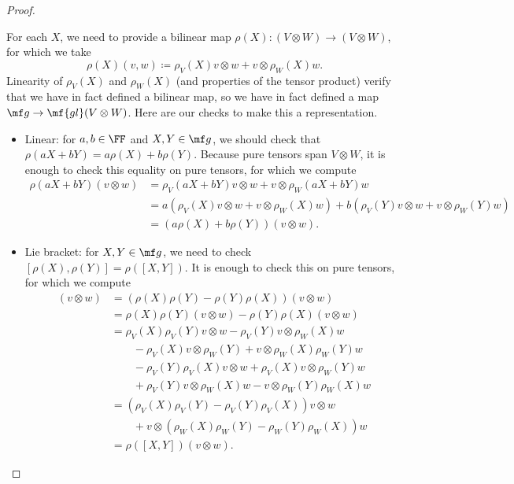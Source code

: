 \documentclass[../notes.tex]{subfiles}
\begin{document}
\begin{proof}
\begin{listalph}
		\item For each $X$, we need to provide a bilinear map $\rho(X)\colon(V\otimes W)\to(V\otimes W)$, for which we take
		\[\rho(X)(v,w)\coloneqq\rho_V(X)v\otimes w+v\otimes\rho_W(X)w.\]
		Linearity of $\rho_V(X)$ and $\rho_W(X)$ (and properties of the tensor product) verify that we have in fact defined a bilinear map, so we have in fact defined a map $\mf g\to\mf{gl}(V\otimes W)$. Here are our checks to make this a representation.
		\begin{itemize}
			\item Linear: for $a,b\in\FF$ and $X,Y\in\mf g$, we should check that $\rho(aX+bY)=a\rho(X)+b\rho(Y)$. Because pure tensors span $V\otimes W$, it is enough to check this equality on pure tensors, for which we compute
			\begin{align*}
				\rho(aX+bY)(v\otimes w) &= \rho_V(aX+bY)v\otimes w+v\otimes\rho_W(aX+bY)w \\
				&= a(\rho_V(X)v\otimes w+v\otimes\rho_W(X)w)+b(\rho_V(Y)v\otimes w+v\otimes\rho_W(Y)w) \\
				&= (a\rho(X)+b\rho(Y))(v\otimes w).
			\end{align*}
			\item Lie bracket: for $X,Y\in\mf g$, we need to check $[\rho(X),\rho(Y)]=\rho([X,Y])$. It is enough to check this on pure tensors, for which we compute
			\begin{align*}
				[\rho(X),\rho(Y)](v\otimes w) &= (\rho(X)\rho(Y)-\rho(Y)\rho(X))(v\otimes w) \\
				&= \rho(X)\rho(Y)(v\otimes w)-\rho(Y)\rho(X)(v\otimes w) \\
				&= \rho_V(X)\rho_V(Y)v\otimes w-\rho_V(Y)v\otimes\rho_W(X)w \\
				&\qquad-\rho_V(X)v\otimes\rho_W(Y)+v\otimes\rho_W(X)\rho_W(Y)w \\
				&\qquad-\rho_V(Y)\rho_V(X)v\otimes w+\rho_V(X)v\otimes\rho_W(Y)w \\
				&\qquad+\rho_V(Y)v\otimes\rho_W(X)w-v\otimes\rho_W(Y)\rho_W(X)w \\
				&= (\rho_V(X)\rho_V(Y)-\rho_V(Y)\rho_V(X))v\otimes w \\
				&\qquad+v\otimes(\rho_W(X)\rho_W(Y)-\rho_W(Y)\rho_W(X))w \\
				&= \rho([X,Y])(v\otimes w).
			\end{align*}
		\end{itemize}


\end{listalph}
\end{proof}
\end{document}
